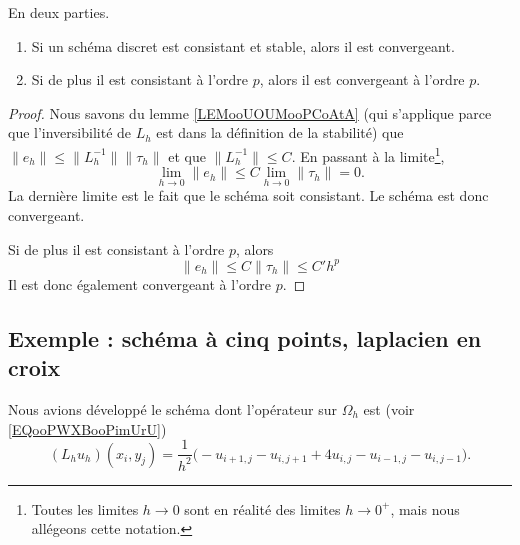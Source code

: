 \begin{theorem}     \label{THOooEPQQooUQMcgF}
    En deux parties.
    \begin{enumerate}
        \item
            Si un schéma discret est consistant et stable, alors il est convergeant. 
        \item
            Si de plus il est consistant à l'ordre \( p\), alors il est convergeant à l'ordre \( p\).
    \end{enumerate}
\end{theorem}

\begin{proof}
    Nous savons du lemme \ref{LEMooUOUMooPCoAtA} (qui s'applique parce que l'inversibilité de \( L_h\) est dans la définition de la stabilité) que  \( \| e_h \|\leq \| L_h^{-1} \| \| \tau_h \|\) et que  \( \| L_h^{-1} \|\leq C  \). En passant à la limite\footnote{Toutes les limites \( h\to 0\) sont en réalité des limites \( h\to 0^+\), mais nous allégeons cette notation.},
    \begin{equation}
        \lim_{h\to 0} \| e_h \|\leq C\lim_{h\to 0} \| \tau_h \|=0.
    \end{equation}
    La dernière limite est le fait que le schéma soit consistant. Le schéma est donc convergeant.

    Si de plus il est consistant à l'ordre \( p\), alors
    \begin{equation}
        \| e_h \|\leq C\| \tau_h \|\leq C'h^p
    \end{equation}
    Il est donc également convergeant à l'ordre \( p\).
\end{proof}

\subsection{Exemple : schéma à cinq points, laplacien en croix}

Nous avions développé le schéma dont l'opérateur sur \( \Omega_h\) est (voir \eqref{EQooPWXBooPimUrU}) 
\begin{equation}
    (L_hu_h)(x_i,y_j)=\frac{1}{ h^2 }\big( -u_{i+1,j}-u_{i,j+1} +4u_{i,j}-u_{i-1,j}-u_{i,j-1}  \big).
\end{equation}


